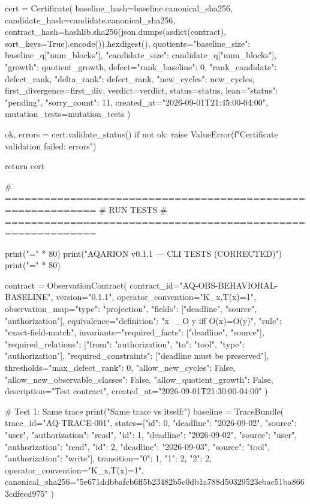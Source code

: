     cert = Certificate(
        baseline_hash=baseline.canonical_sha256,
        candidate_hash=candidate.canonical_sha256,
        contract_hash=hashlib.sha256(json.dumps(asdict(contract), sort_keys=True).encode()).hexdigest(),
        quotients={"baseline_size": baseline_q["num_blocks"], "candidate_size": candidate_q["num_blocks"], "growth": quotient_growth},
        defect={"rank_baseline": 0, "rank_candidate": defect_rank, "delta_rank": defect_rank, "new_cycles": new_cycles},
        first_divergence=first_div,
        verdict=verdict,
        status=status,
        lean={"status": "pending", "sorry_count": 11},
        created_at="2026-09-01T21:45:00-04:00",
        mutation_tests=mutation_tests
    )
    
    ok, errors = cert.validate_status()
    if not ok:
        raise ValueError(f"Certificate validation failed: {errors}")
    
    return cert

# ============================================================
# RUN TESTS
# ============================================================

print("=" * 80)
print("AQARION v0.1.1 — CLI TESTS (CORRECTED)")
print("=" * 80)

contract = ObservationContract(
    contract_id="AQ-OBS-BEHAVIORAL-BASELINE",
    version="0.1.1",
    operator_convention="K_x,T(x)=1",
    observation_map={"type": "projection", "fields": ["deadline", "source", "authorization"]},
    equivalence={"definition": "x ~_O y iff O(x)=O(y)", "rule": "exact-field-match"},
    invariants={"required_facts": ["deadline", "source"], "required_relations": [{"from": "authorization", "to": "tool", "type": "authorization"}], "required_constraints": ["deadline must be preserved"]},
    thresholds={"max_defect_rank": 0, "allow_new_cycles": False, "allow_new_observable_classes": False, "allow_quotient_growth": False},
    description="Test contract",
    created_at="2026-09-01T21:30:00-04:00"
)

# Test 1: Same trace
print("\n[Test 1] Same trace vs itself:")
baseline = TraceBundle(
    trace_id="AQ-TRACE-001",
    states=[{"id": 0, "deadline": "2026-09-02", "source": "user", "authorization": "read"},
            {"id": 1, "deadline": "2026-09-02", "source": "user", "authorization": "read"},
            {"id": 2, "deadline": "2026-09-03", "source": "tool", "authorization": "write"}],
    transition={"0": 1, "1": 2, "2": 2},
    operator_convention="K_x,T(x)=1",
    canonical_sha256="5e671ddbbafcb6ff5b23482b5c0db1a788d50329523ebac51ba8663cdfecd975"
)


